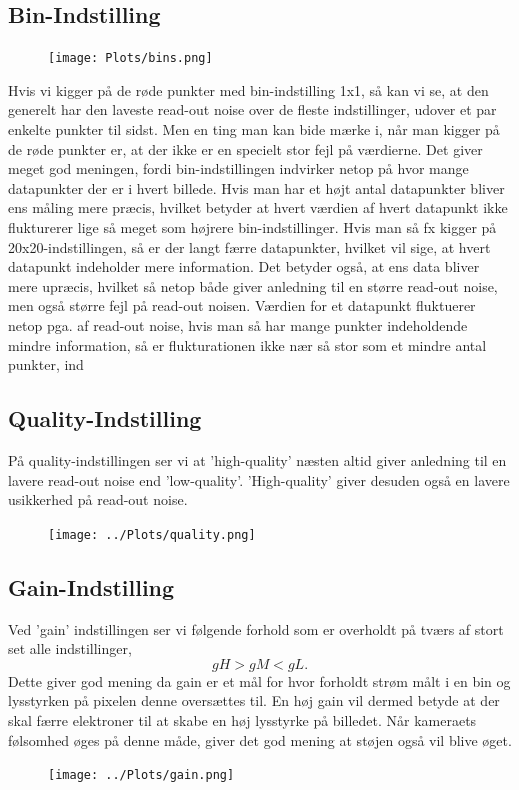 \documentclass[working]{tuftebook}
\begin{document}
\subsection{Bin-Indstilling}
\begin{figure}[ht]
\centering
{}
\texttt{[image: Plots/bins.png]}	
\end{figure}
Hvis vi kigger på de røde punkter med bin-indstilling 1x1, så kan vi se, at den generelt har den laveste read-out noise over de fleste indstillinger, udover et par enkelte punkter til sidst. Men en ting man kan bide mærke i, når man kigger på de røde punkter er, at der ikke er en specielt stor fejl på værdierne. Det giver meget god meningen, fordi bin-indstillingen indvirker netop på hvor mange datapunkter der er i hvert billede. Hvis man har et højt antal datapunkter bliver ens måling mere præcis, hvilket betyder at hvert værdien af hvert datapunkt ikke flukturerer lige så meget som højrere bin-indstillinger. Hvis man så fx kigger på 20x20-indstillingen, så er der langt færre datapunkter, hvilket vil sige, at hvert datapunkt indeholder mere information. Det betyder også, at ens data bliver mere upræcis, hvilket så netop både giver anledning til en større read-out noise, men også større fejl på read-out noisen. Værdien for et datapunkt fluktuerer netop pga. af read-out noise, hvis man så har mange punkter indeholdende mindre information, så er flukturationen ikke nær så stor som et mindre antal punkter, ind
\subsection{Quality-Indstilling}
På quality-indstillingen ser vi at 'high-quality' næsten altid giver anledning til en lavere read-out noise end 'low-quality'. 'High-quality' giver desuden også en lavere usikkerhed på read-out noise.
\begin{figure}[ht]
\centering
{}
\texttt{[image: ../Plots/quality.png]}	
\end{figure}

\subsection{Gain-Indstilling} 
Ved 'gain' indstillingen ser vi følgende forhold som er overholdt på tværs af stort set alle indstillinger,
\[
gH > gM < gL
.\]
Dette giver god mening da gain er et mål for hvor forholdt strøm målt i en bin og lysstyrken på pixelen denne oversættes til. En høj gain vil dermed betyde at der skal færre elektroner til at skabe en høj lysstyrke på billedet. Når kameraets følsomhed øges på denne måde, giver det god mening at støjen også vil blive øget.
\begin{figure}[ht]
\centering
{}
\texttt{[image: ../Plots/gain.png]}	
\end{figure}
\end{document}
